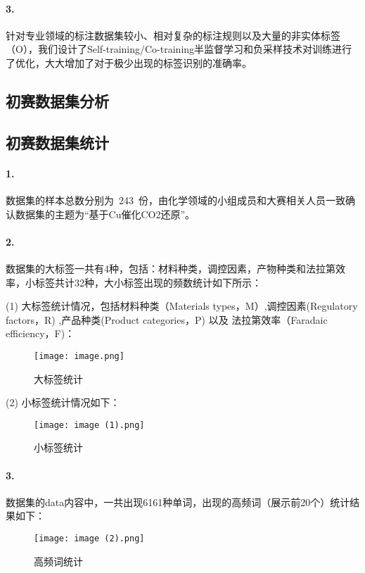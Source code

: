 \documentclass{article}
\begin{document}
\paragraph{3.}针对专业领域的标注数据集较小、相对复杂的标注规则以及大量的非实体标签（O），我们设计了Self-training/Co-training半监督学习和负采样技术对训练进行了优化，大大增加了对于极少出现的标签识别的准确率。
\newpage
\begin{center}
	\section{初赛数据集分析}
\end{center}

\subsection{初赛数据集统计}
\paragraph{1.}数据集的样本总数分别为 243 份，由化学领域的小组成员和大赛相关人员一致确认数据集的主题为“基于Cu催化CO2​还原”。
\paragraph{2.}数据集的大标签一共有4种，包括：材料种类，调控因素，产物种类和法拉第效率，小标签共计32种，大小标签出现的频数统计如下所示：

(1) 大标签统计情况，包括材料种类（Materials types，M）,调控因素(Regulatory factors，R) ,产品种类(Product categories，P) 以及 法拉第效率（Faradaic efficiency，F)： 
\begin{figure}[H]
	\centering
    \texttt{[image: image.png]}
    \caption{大标签统计}
    \label{fig:labels}
\end{figure}

(2) 小标签统计情况如下：

\begin{figure}[H]
	\centering
    \texttt{[image: image (1).png]}
    \caption{小标签统计}
    \label{fig:small_labels}
\end{figure}

\paragraph{3.}数据集的data内容中，一共出现6161种单词，出现的高频词（展示前20个）统计结果如下：
\begin{figure}[H]
	\centering
    \texttt{[image: image (2).png]}
    \caption{高频词统计}
    \label{fig:vocab}
\end{figure}
\end{document}

